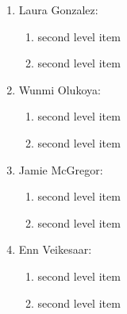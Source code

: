 \documentclass[12pt]{article}
\begin{document}
\begin{enumerate}
\item Laura Gonzalez:
    \begin{enumerate}
          \item second level item
          \item second level item
    \end{enumerate}
\item Wunmi Olukoya:
        \begin{enumerate}
          \item second level item
          \item second level item
    \end{enumerate}
\item Jamie McGregor: 
        \begin{enumerate}
          \item second level item
          \item second level item
    \end{enumerate}
\item Enn Veikesaar:
        \begin{enumerate}
          \item second level item
          \item second level item
    \end{enumerate}
\end{enumerate}

\clearpage


\vspace{0.1 in}

\vspace{0.1 in}

\vspace{0.1 in}

\vspace{0.1 in}

\vspace{0.1 in}

\vspace{0.1 in}


\newpage
\singlespacing


\end{document}
